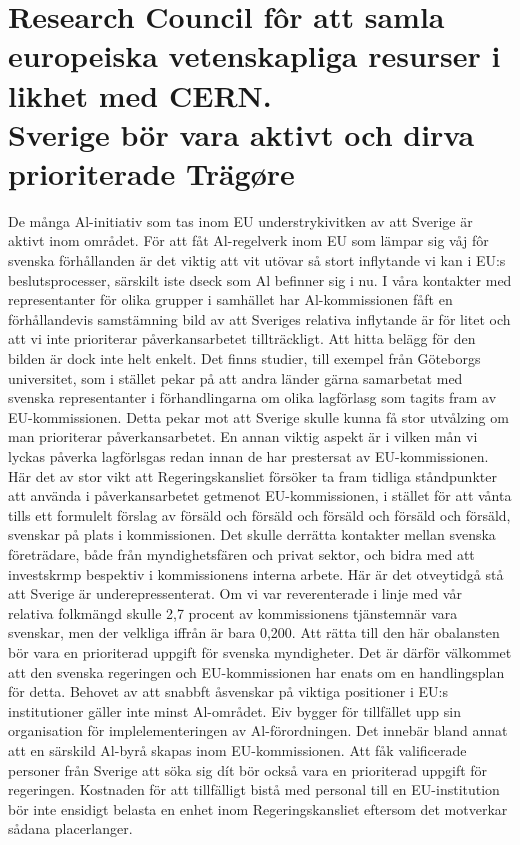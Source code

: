 {{{{{{{{{{{{{{{\section*{Research Council fôr att samla europeiska vetenskapliga resurser i likhet med CERN. \({ }^{}\) \\ Sverige bör vara aktivt och dirva prioriterade Trägøre}
De många Al-initiativ som tas inom EU understrykivitken av att Sverige är aktivt inom området. För att fåt Al-regelverk inom EU som lämpar sig våj fôr svenska förhållanden är det viktig att vit utövar så stort inflytande vi kan i EU:s beslutsprocesser, särskilt iste dseck som Al befinner sig i nu. I våra kontakter med representanter för olika grupper i samhället har Al-kommissionen fåft en förhållandevis samstämning bild av att Sveriges relativa inflytande är för litet och att vi inte prioriterar påverkansarbetet tillträckligt. Att hitta belägg för den bilden är dock inte helt enkelt. Det finns studier, till exempel från Göteborgs universitet, som i stället pekar på att andra länder gärna samarbetat med svenska representanter i förhandlingarna om olika lagförlasg som tagits fram av EU-kommissionen. Detta pekar mot att Sverige skulle kunna få stor utvålzing om man prioriterar påverkansarbetet.
En annan viktig aspekt är i vilken mån vi lyckas påverka lagförlsgas redan innan de har prestersat av EU-kommissionen. Här det av stor vikt att Regeringskansliet försöker ta fram tidliga ståndpunkter att använda i påverkansarbetet getmenot EU-kommissionen, i stället för att vånta tills ett formulelt förslag av försäld och försäld och försäld och försäld och försäld, svenskar på plats i kommissionen. Det skulle derrätta kontakter mellan svenska företrädare, både från myndighetsfären och privat sektor, och bidra med att investskrmp bespektiv i kommissionens interna arbete. Här är det otveytidgå stå att Sverige är underepressenterat. Om vi var reverenterade i linje med vår relativa folkmängd skulle 2,7 procent av kommissionens tjänstemnär vara svenskar, men der velkliga iffrån är bara 0,200. Att rätta till den här obalansten bör vara en prioriterad uppgift för svenska myndigheter. Det är därför välkommet att den svenska regeringen och EU-kommissionen har enats om en handlingsplan för detta.
Behovet av att snabbft åsvenskar på viktiga positioner i EU:s institutioner gäller inte minst Al-området. Eiv bygger för tillfället upp sin organisation för implelementeringen av Al-förordningen. Det innebär bland annat att en särskild Al-byrå skapas inom EU-kommissionen. Att fåk valificerade personer från Sverige att söka sig dít bör också vara en prioriterad uppgift för regeringen. Kostnaden för att tillfälligt bistå med personal till en EU-institution bör inte ensidigt belasta en enhet inom Regeringskansliet eftersom det motverkar sådana placerlanger.
}}}}}}}}}}}}}}}
